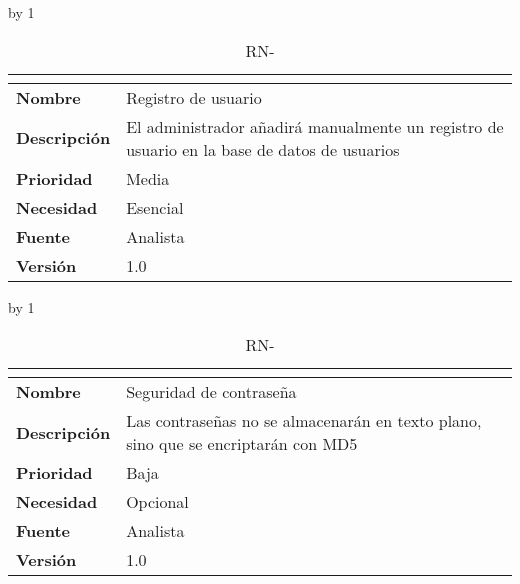 \advance\rn by 1
\begin{table}[H]
	\caption{RN-\number\rn}
	\begin{tabular}{|l|p{}|}
		\hline
		\multicolumn{2}{|c|}{\cellcolor[HTML]{BFBFBF}{\color[HTML]{000000} \textbf{RN-\number\rn}}} \\ \hline
		\textbf{Nombre}      & Registro de usuario                                                                         \\ \hline
		\textbf{Descripción} & El administrador añadirá manualmente un registro de usuario en la base de datos de usuarios \\ \hline
		\textbf{Prioridad}   & Media                                                                                       \\ \hline
		\textbf{Necesidad}   & Esencial                                                                                    \\ \hline
		\textbf{Fuente}      & Analista                                                                                    \\ \hline
		\textbf{Versión}     & 1.0                                                                                         \\ \hline
	\end{tabular}
\end{table}
\advance\rn by 1
\begin{table}[H]
	\caption{RN-\number\rn}
	\begin{tabular}{|l|p{}|}
		\hline
		\multicolumn{2}{|c|}{\cellcolor[HTML]{BFBFBF}{\color[HTML]{000000} \textbf{RN-\number\rn}}} \\ \hline
		\textbf{Nombre}      & Seguridad de contraseña                                                           \\ \hline
		\textbf{Descripción} & Las contraseñas no se almacenarán en texto plano, sino que se encriptarán con MD5 \\ \hline
		\textbf{Prioridad}   & Baja                                                                              \\ \hline
		\textbf{Necesidad}   & Opcional                                                                          \\ \hline
		\textbf{Fuente}      & Analista                                                                          \\ \hline
		\textbf{Versión}     & 1.0                                                                               \\ \hline
	\end{tabular}
\end{table}

